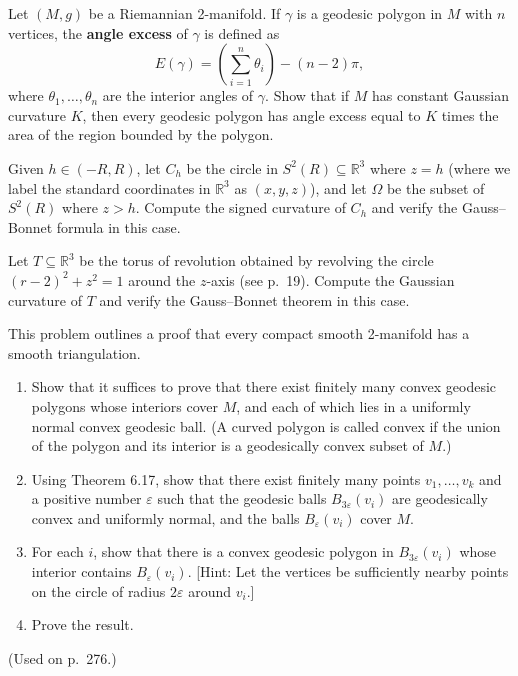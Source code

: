 \begin{exercise}
\label{prob:angle-excess-formula}
Let $(M, g)$ be a Riemannian 2-manifold. If $\gamma$ is a geodesic polygon in $M$ with $n$ vertices, the \textbf{angle excess} of $\gamma$ is defined as
\[
E(\gamma) = \left(\sum_{i=1}^{n} \theta_i\right) - (n-2)\pi,
\]
where $\theta_1, \ldots, \theta_n$ are the interior angles of $\gamma$. Show that if $M$ has constant Gaussian curvature $K$, then every geodesic polygon has angle excess equal to $K$ times the area of the region bounded by the polygon.
\end{exercise}

\begin{exercise}
\label{prob:gauss-bonnet-sphere}
Given $h \in (-R, R)$, let $C_h$ be the circle in $S^2(R) \subseteq \mathbb{R}^3$ where $z = h$ (where we label the standard coordinates in $\mathbb{R}^3$ as $(x, y, z)$), and let $\Omega$ be the subset of $S^2(R)$ where $z > h$. Compute the signed curvature of $C_h$ and verify the Gauss--Bonnet formula in this case.
\end{exercise}

\begin{exercise}
\label{prob:gauss-bonnet-torus}
Let $T \subseteq \mathbb{R}^3$ be the torus of revolution obtained by revolving the circle $(r - 2)^2 + z^2 = 1$ around the $z$-axis (see p.\ 19). Compute the Gaussian curvature of $T$ and verify the Gauss--Bonnet theorem in this case.
\end{exercise}

\begin{exercise}
\label{prob:triangulation-2manifold}
This problem outlines a proof that every compact smooth 2-manifold has a smooth triangulation.
\begin{enumerate}
\item[(a)] Show that it suffices to prove that there exist finitely many convex geodesic polygons whose interiors cover $M$, and each of which lies in a uniformly normal convex geodesic ball. (A curved polygon is called convex if the union of the polygon and its interior is a geodesically convex subset of $M$.)
\item[(b)] Using Theorem 6.17, show that there exist finitely many points $v_1, \ldots, v_k$ and a positive number $\varepsilon$ such that the geodesic balls $B_{3\varepsilon}(v_i)$ are geodesically convex and uniformly normal, and the balls $B_\varepsilon(v_i)$ cover $M$.
\item[(c)] For each $i$, show that there is a convex geodesic polygon in $B_{3\varepsilon}(v_i)$ whose interior contains $B_\varepsilon(v_i)$. [Hint: Let the vertices be sufficiently nearby points on the circle of radius $2\varepsilon$ around $v_i$.]
\item[(d)] Prove the result.
\end{enumerate}
(Used on p.\ 276.)
\end{exercise}


